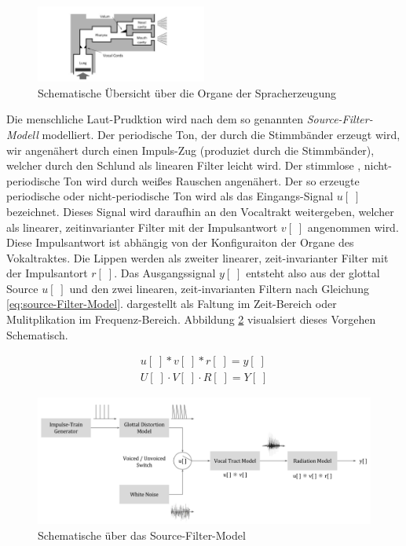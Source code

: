 \begin{figure}[h]
	\centering
	\includegraphics[width=0.5\textwidth]{bilder/SchematicVocalOrgans.png}
	\caption{Schematische Übersicht über die Organe der Spracherzeugung \cite{speechProduction}}
	\label{img:schematicVocalOrgans}
\end{figure}	

Die menschliche Laut-Prudktion wird nach dem so genannten \emph{Source-Filter-Modell} modelliert. Der periodische Ton, der durch die Stimmbänder erzeugt wird, wir angenähert durch einen Impuls-Zug (produziet durch die Stimmbänder), welcher durch den Schlund als linearen Filter leicht wird. Der stimmlose , nicht-periodische Ton wird durch weißes Rauschen angenähert. Der so erzeugte periodische oder nicht-periodische Ton wird als das Eingangs-Signal $u[\;]$ bezeichnet. Dieses Signal wird daraufhin an den Vocaltrakt weitergeben, welcher als linearer, zeitinvarianter Filter mit der Impulsantwort $v[\;]$ angenommen wird. Diese Impulsantwort ist abhängig von der Konfiguraiton der Organe des Vokaltraktes. Die Lippen werden als zweiter linearer, zeit-invarianter Filter mit der Impulsantort $r[\;]$. Das Ausgangssignal $y[\;]$ entsteht also aus der glottal Source $u[\;]$ und den zwei linearen, zeit-invarianten Filtern nach Gleichung \ref{eq:source-Filter-Model}. dargestellt als Faltung im Zeit-Bereich oder Mulitplikation im Frequenz-Bereich.
Abbildung \ref{img:source-filter-model} visualsiert dieses Vorgehen Schematisch. \cite[S. 62 - 63]{cryModel} \cite{speechProduction}

\begin{equation}
\begin{gathered}
u[\;] * v[\;] * r[\;] = y[\;] \\
U[\;] \cdot V[\;] \cdot R[\;] = Y[\;] 
\end{gathered} 
\label{eq:source-Filter-Model}
\end{equation}

\begin{figure}[h]
	\centering
	\includegraphics[width=1\textwidth]{bilder/source-filter-model.png}
	\caption{Schematische über das Source-Filter-Model \cite[Source estimation, S. 17]{ricardo_ceps}}
	\label{img:source-filter-model}
\end{figure}	

